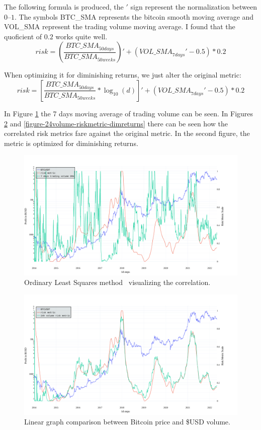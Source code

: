 The following formula is produced, the $'$ sign represent the normalization between $0$--$1$. The symbols BTC\_SMA represents the bitcoin smooth moving average and VOL\_SMA represent the trading volume moving average. I found that the quoficient of $0.2$ works quite well.
$$risk = \left(\frac{\mathit{BTC\_SMA}_{50 days}}{\mathit{BTC\_SMA}_{50 weeks}}\right)' + \left(\mathit{VOL\_SMA}_{7 days}' - 0.5\right) * 0.2$$

When optimizing it for diminishing returns, we just alter the original metric:
$$risk = \left[\frac{\mathit{BTC\_SMA}_{50 days}}{\mathit{BTC\_SMA}_{50 weeks}} * \log_{10}(d)\right]' + \left(\mathit{VOL\_SMA}_{7 days}' - 0.5\right) * 0.2$$

In Figure \ref{figure-24volume-7sma} the 7 days moving average of trading volume can be seen. In Figures \ref{figure-24volume-riskmetric} and \ref{figure-24volume-riskmetric-dimreturns} there can be seen how the correlated risk metrics fare against the original metric. In the second figure, the metric is optimized for diminishing returns.

\begin{figure}[!hbt]
    \centering
    \includegraphics[width=\columnwidth]{figures/24volume-7sma.pdf}
    \caption{Ordinary Least Squares method~\cite{wikipedia:ols} visualizing the correlation.}
    \label{figure-24volume-7sma}
\end{figure}

\begin{figure}[!hbt]
    \centering
    \includegraphics[width=\columnwidth]{figures/24volume-riskmetric.pdf}
    \caption{Linear graph comparison between Bitcoin price and \$USD volume.}
    \label{figure-24volume-riskmetric}
\end{figure}

